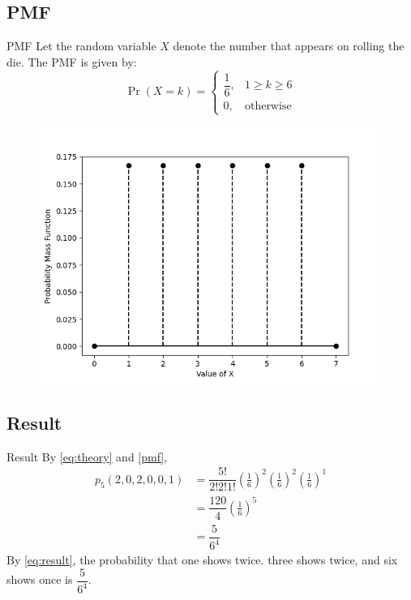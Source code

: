 \documentclass{beamer}
\providecommand{\pr}[1]{\ensuremath{\Pr\left(#1\right)}}
\providecommand{\brak}[1]{\ensuremath{\left(#1\right)}}
\begin{document}
\subsection{PMF}
\begin{frame}{PMF}
    Let the random variable $X$ denote the number that appears on rolling the die. The PMF is given by:
    \begin{equation}
        \pr{X = k} = 
        \begin{cases}
            \dfrac{1}{6}, & 1 \geq k \geq 6 \\
            0, & \text{otherwise}
        \end{cases}
        \label{pmf}
    \end{equation}
    \begin{figure}[H]
        \centering
        \includegraphics[scale = 0.39]{./figs/figure.png}
        \caption{}
        \label{fig:pmf}
    \end{figure}
\end{frame}

\subsection{Result}
\begin{frame}{Result}
    By \eqref{eq:theory} and \eqref{pmf},
    \begin{align}
        p_5\brak{2,0,2,0,0,1} &= \dfrac{5!}{2! 2! 1!} \brak{\frac{1}{6}}^2 \brak{\frac{1}{6}}^2 \brak{\frac{1}{6}}^1
        \\
        &= \dfrac{120}{4} \brak{\frac{1}{6}}^5
        \\
        \label{eq:result}
        &= \dfrac{5}{6^4}
    \end{align}
    By \eqref{eq:result}, the probability that one shows twice. three shows twice, and six shows once is $\dfrac{5}{6^4}$.
\end{frame}
\end{document}
